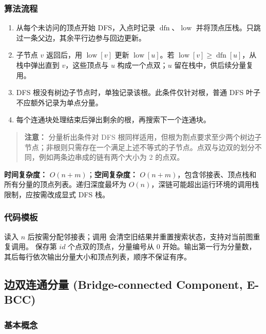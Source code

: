 \subsubsection{算法流程}

\begin{enumerate}
  \item 从每个未访问的顶点开始 DFS，入点时记录 $\operatorname{dfn}$、$\operatorname{low}$ 并将顶点压栈。只跳过一条父边，其余平行边参与回边更新。
  \item 子节点 $v$ 返回后，用 $\operatorname{low}[v]$ 更新 $\operatorname{low}[u]$。若 $\operatorname{low}[v]\ge\operatorname{dfn}[u]$，从栈中弹出直到 $v$，这些顶点与 $u$ 构成一个点双；$u$ 留在栈中，供后续分量复用。
  \item DFS 根没有树边子节点时，单独记录该根。此条件仅针对根，普通 DFS 叶子不应额外记录为单点分量。
  \item 每个连通块处理结束后弹出剩余的根，再搜索下一个连通块。
\end{enumerate}

\begin{quote}
\textbf{注意：} 分量析出条件对 DFS 根同样适用，但根为割点要求至少两个树边子节点；非根则只需存在一个满足上述不等式的子节点。点双与边双的划分不同，例如两条边串成的链有两个大小为 $2$ 的点双。
\end{quote}

\textbf{时间复杂度：} $O(n+m)$；\textbf{空间复杂度：} $O(n+m)$，包含邻接表、顶点栈和所有分量的顶点列表。递归深度最坏为 $O(n)$，深链可能超出运行环境的调用栈限制，应按需改成显式 DFS 栈。

\subsubsection{代码模板}

读入 $n$ 后按需分配邻接表；调用  会清空旧结果并重置搜索状态，支持对当前图重复调用。 保存第 $id$ 个点双的顶点，分量编号从 $0$ 开始。输出第一行为分量数，其后每行依次输出分量大小和顶点列表，顺序不保证有序。



\subsection{边双连通分量 (Bridge-connected Component, E-BCC)}

\subsubsection{基本概念}

